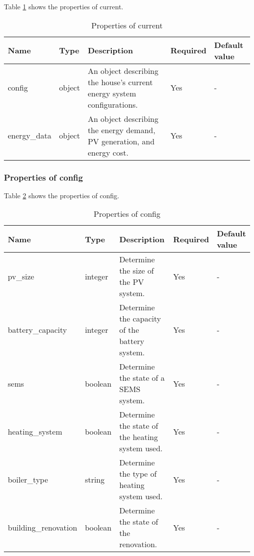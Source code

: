 Table \ref{tab:properties_current} shows the properties of current. 
\begin{table}[h!]
    \centering
    \small
    \begin{tabular}{ | p{} | p{} | p{} | p{} | p{} | } 
    \hline
    Name & Type & Description & Required & Default value \\
    \hline
    config & object & An object describing the house's current energy system configurations. & Yes & - \\
    \hline
    energy\_data & object & An object describing the energy demand, PV generation, and energy cost. & Yes & - \\
    \hline
    \end{tabular}
    \caption{Properties of current}
    \label{tab:properties_current}
\end{table}


\subsubsection{Properties of config}

Table \ref{tab:properties_config} shows the properties of config. 
\begin{table}[h!]
    \centering
    \small
    \begin{tabular}{ | p{} | p{} | p{} | p{} | p{} | } 
    \hline
    Name & Type & Description & Required & Default value \\
    \hline
    pv\_size & integer & Determine the size of the PV system. & Yes & - \\
    \hline
    battery\_capacity & integer & Determine the capacity of the battery system. & Yes & - \\
    \hline
    sems & boolean & Determine the state of a SEMS system. & Yes & - \\
    \hline
    heating\_system & boolean & Determine the state of the heating system used.	 & Yes & - \\
    \hline
    boiler\_type & string & Determine the type of heating system used. & Yes & - \\
    \hline
    building\_renovation & boolean & Determine the state of the renovation. & Yes & - \\
    \hline
    \end{tabular}
    \caption{Properties of config}
    \label{tab:properties_config}
\end{table}


